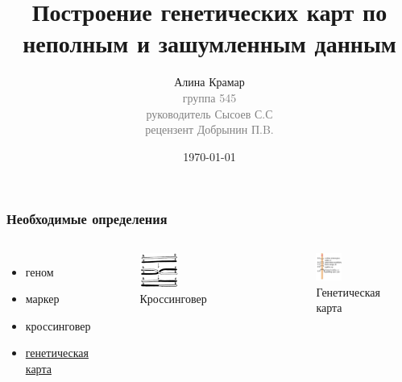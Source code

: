 \documentclass{beamer}
\title{Построение генетических карт по неполным и
зашумленным данным}
\author{Алина Крамар\\
  { \footnotesize \textcolor{gray}{группа 545\\ руководитель Сысоев
      С.С\\ рецензент Добрынин П.B.}}}
\institute{Санкт-Петербургский государственный университет}
\date{\today}
\begin{document}
\newcommand{\genmap}{\textbf{genmap}}

\begin{frame}
\titlepage
\end{frame}

\begin{frame}
  \frametitle{Необходимые определения}

  \begin{columns}
    \begin{itemize}
    \item геном
    \item маркер
    \item кроссинговер
    \item \underline{генетическая карта}
    \end{itemize}

    \begin{figure}
      \includegraphics[width=0.4\textwidth]{cross.png}
      \caption{Кроссинговер}
    \end{figure}
    \begin{figure}
      \includegraphics[width=0.4\textwidth]{map.png}
      \caption{Генетическая карта}
    \end{figure}

  \end{columns}
\end{frame}
\end{document}
